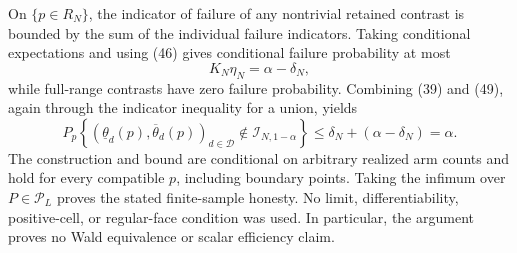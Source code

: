 On \(\{p\in R_N\}\), the indicator of failure of any nontrivial retained contrast is bounded by the sum of the individual failure indicators.  Taking conditional expectations and using (46) gives conditional failure probability at most
\[
 K_N\eta_N=\alpha-\delta_N,                                                 \tag{49}
\]
while full-range contrasts have zero failure probability.  Combining (39) and (49), again through the indicator inequality for a union, yields
\[
 P_p\left\{(\underline\theta_d(p),\overline\theta_d(p))_{d\in\mathcal D}
 \notin\mathcal I_{N,1-\alpha}\right\}
 \leq\delta_N+(\alpha-\delta_N)=\alpha.                                   \tag{50}
\]
The construction and bound are conditional on arbitrary realized arm counts and hold for every compatible \(p\), including boundary points.  Taking the infimum over \(P\in\mathcal P_L\) proves the stated finite-sample honesty.  No limit, differentiability, positive-cell, or regular-face condition was used.  In particular, the argument proves no Wald equivalence or scalar efficiency claim.
